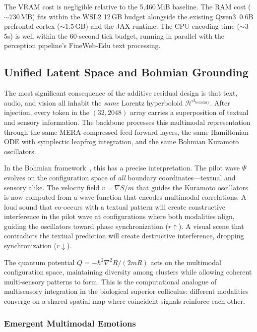The VRAM cost is negligible relative to the 5{,}460\,MiB baseline.
The RAM cost ($\sim$730\,MB) fits within the WSL2 12\,GB budget alongside the existing Qwen3~0.6B prefrontal cortex ($\sim$1.5\,GB) and the JAX runtime.
The CPU encoding time ($\sim$3--5s) is well within the 60-second tick budget, running in parallel with the perception pipeline's FineWeb-Edu text processing.

\subsection{Unified Latent Space and Bohmian Grounding}
\label{sec:sense_bohm}

The most significant consequence of the additive residual design is that text, audio, and vision all inhabit the \emph{same} Lorentz hyperboloid $\mathcal{H}^{d_{\mathrm{boundary}}}$.
After injection, every token in the $(32, 2048)$ array carries a superposition of textual and sensory information.
The backbone processes this multimodal representation through the same MERA-compressed feed-forward layers, the same Hamiltonian ODE with symplectic leapfrog integration, and the same Bohmian Kuramoto oscillators.

In the Bohmian framework~\cite{bohm1980}, this has a precise interpretation.
The pilot wave $\Psi$ evolves on the configuration space of \emph{all} boundary coordinates---textual and sensory alike.
The velocity field $v = \nabla S / m$ that guides the Kuramoto oscillators is now computed from a wave function that encodes multimodal correlations.
A loud sound that co-occurs with a textual pattern will create constructive interference in the pilot wave at configurations where both modalities align, guiding the oscillators toward phase synchronization ($r \uparrow$).
A visual scene that contradicts the textual prediction will create destructive interference, dropping synchronization ($r \downarrow$).

The quantum potential $Q = -\hbar^2 \nabla^2 R / (2mR)$ acts on the multimodal configuration space, maintaining diversity among clusters while allowing coherent multi-sensory patterns to form.
This is the computational analogue of multisensory integration in the biological superior colliculus: different modalities converge on a shared spatial map where coincident signals reinforce each other.

\subsubsection{Emergent Multimodal Emotions}

